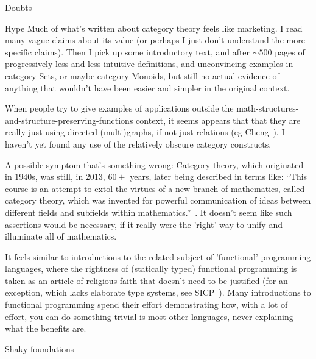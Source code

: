 \begin{plSection}{Doubts}
\begin{plSection}{Hype}
Much of what's written about category theory feels like marketing.
I read many vague claims about its value
(or perhaps I just don't understand the more specific claims).
Then I pick up some introductory text,
and after ${\sim}500$ pages of progressively less and less 
intuitive definitions, and unconvincing examples in category Sets,
or maybe category Monoids,
but still no actual evidence of anything that wouldn't have been
easier and simpler in the original context.

When people try to give examples of applications outside the
math-structures-and-structure-preserving-functions context,
it seems appears that that  they are really just using directed
(multi)graphs, if not just relations (eg Cheng~\cite{Cheng:2020:Latest}).
I haven't yet found any use of the relatively obscure category 
constructs.

A possible symptom that's something wrong:
Category theory, which originated in $1940$s,
was still, in $2013$, $60+$ years, later being described in terms like:
``This course is an attempt to extol the virtues of a new branch of mathematics,
called category theory, which was invented for powerful communication of ideas between
different fields and subfields within mathematics.''~\cite{Spivak:2013:CatTheoryForScientists}.
It doesn't seem like such assertions would be necessary,
if it really were the 'right' way to unify 
and illuminate all of mathematics.

It feels similar to introductions to the related subject of
'functional' programming languages,
where the rightness of (statically typed) functional programming 
is taken as
an article of religious faith that doesn't need to be justified
(for an exception, which lacks elaborate type systems,
see SICP~\cite{AbelsonSussman:1996:SICP}).
Many introductions to functional programming spend their
effort demonstrating how, with a lot of effort, you can do
something trivial is most other languages,
never explaining what the benefits are.

\end{plSection}%
\begin{plSection}{Shaky foundations}
\label{sec:Shaky-foundations}


\end{plSection}
\end{plSection}

